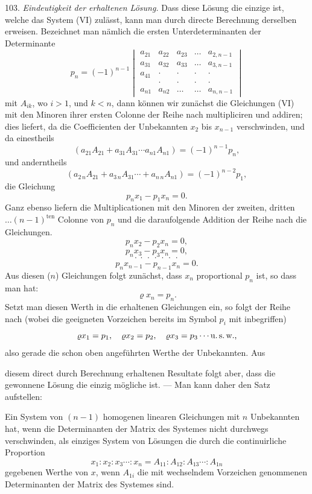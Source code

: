 \documentclass[11pt]{article}
\providecommand{\weberpage}[1]{}
\providecommand{\weq}[2]{\begin{equation}\tag{#1}#2\end{equation}}
\begin{document}
103. \textit{Eindeutigkeit der erhaltenen Lösung.} Dass diese Lösung die einzige ist, welche das System (VI) zulässt, kann man durch directe Berechnung derselben erweisen. Bezeichnet man nämlich die ersten Unterdeterminanten der Determinante
\[
p_n = (-1)^{n-1}
\begin{vmatrix}
a_{21} & a_{22} & a_{23} & \ldots & a_{2,n-1} \\
a_{31} & a_{32} & a_{33} & \ldots & a_{3,n-1} \\
a_{41} & \cdot & \cdot & \cdot & \cdot \\
 & \cdot & \cdot & \cdot & \cdot \\
a_{n1} & a_{n2} & \ldots & \ldots & a_{n,n-1}
\end{vmatrix}
\]
mit $A_{ik}$, wo $i>1$, und $k<n$, dann können wir zunächst die Gleichungen (VI) mit den Minoren ihrer ersten Colonne der Reihe nach multipliciren und addiren; dies liefert, da die Coefficienten der Unbekannten $x_2$ bis $x_{n-1}$ verschwinden, und da einestheils
\[ (a_{21}A_{21}+a_{31}A_{31}\cdots a_{n1}A_{n1}) = (-1)^{n-1}p_n, \]
und anderntheils
\[ (a_{2\,n}A_{21}+a_{3\,n}A_{31}\cdots+a_{n\,n}A_{n1}) = (-1)^{n-2}p_1, \]
die Gleichung
\weq{1}{p_n x_1 - p_1 x_n = 0.}
Ganz ebenso liefern die Multiplicationen mit den Minoren der zweiten, dritten $\ldots(n-1)^{\text{ten}}$ Colonne von $p_n$ und die daraufolgende Addition der Reihe nach die Gleichungen.
\weq{2}{p_n x_2 - p_2 x_n = 0,}
\weq{3}{p_n x_3 - p_3 x_n = 0,}
\[ \cdot\ \cdot\ \cdot\ \cdot\ \cdot\ \cdot\ \cdot \]
\weq{(n)}{p_n x_{n-1} - p_{n-1} x_n = 0.}
Aus diesen ($n$) Gleichungen folgt zunächst, dass $x_n$ proportional $p_n$ ist, so dass man hat:
\[ \varrho x_n = p_n. \]
Setzt man diesen Werth in die erhaltenen Gleichungen ein, so folgt der Reihe nach (wobei die geeigneten Vorzeichen bereits im Symbol $p_i$ mit inbegriffen)
\[ \varrho x_1 = p_1, \quad \varrho x_2 = p_2, \quad \varrho x_3 = p_3 \cdots \text{u.\,s.\,w.,} \]
also gerade die schon oben angeführten Werthe der Unbekannten. Aus


\weberpage{108}
diesem direct durch Berechnung erhaltenen Resultate folgt aber, dass die gewonnene Lösung die einzig mögliche ist. — Man kann daher den Satz aufstellen:

\glqq Ein System von $(n-1)$ homogenen linearen Gleichungen mit $n$ Unbekannten hat, wenn die Determinanten der Matrix des Systemes nicht durchwegs verschwinden, als einziges System von Lösungen die durch die continuirliche Proportion
\[ x_1:x_2:x_3\cdots:x_n = A_{11}:A_{12}:A_{13}\cdots:A_{1n} \]
gegebenen Werthe von $x$, wenn $A_{1i}$ die mit wechselndem Vorzeichen genommenen Determinanten der Matrix des Systemes sind.\grqq{}
\end{document}
